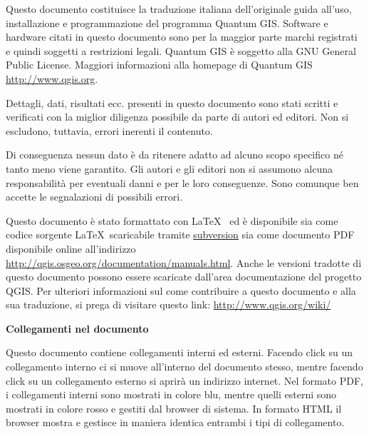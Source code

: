 \frontmatter
\pagestyle{scrplain}
\vspace{1cm}


Questo documento costituisce la traduzione italiana dell’originale guida all’uso, installazione e
programmazione del programma Quantum GIS. Software e hardware citati in questo documento
sono per la maggior parte marchi registrati e quindi soggetti a restrizioni legali. Quantum GIS è 
soggetto alla GNU General Public License. Maggiori informazioni alla homepage di Quantum GIS
\url{http://www.qgis.org}.
\par\bigskip
Dettagli, dati, risultati ecc. presenti in questo documento sono stati scritti e verificati con la miglior
diligenza possibile da parte di autori ed editori. Non si escludono, tuttavia, errori inerenti il contenuto.
\par\bigskip
Di conseguenza nessun dato è da ritenere adatto ad alcuno scopo specifico né tanto meno viene
garantito. Gli autori e gli editori non si assumono alcuna responsabilità per eventuali danni e per le
loro conseguenze. Sono comunque ben accette le segnalazioni di possibili errori.
\par\bigskip
Questo documento è stato formattato con \LaTeX~ ed è disponibile sia come codice sorgente \LaTeX~scaricabile 
tramite \href{http://wiki.qgis.org/qgiswiki/DocumentationWritersCorner}{subversion} 
sia come documento PDF disponibile online all’indirizzo \url{http://qgis.osgeo.org/documentation/manuals.html}. 
Anche le versioni tradotte di questo documento possono essere scaricate dall’area 
documentazione del progetto QGIS. Per ulteriori informazioni sul come contribuire a questo 
documento e alla sua traduzione, si prega di visitare questo link: \url{http://www.qgis.org/wiki/} 

\vspace{1cm}
\noindent
\textbf{Collegamenti nel documento}
\par\bigskip
Questo documento contiene collegamenti interni ed esterni. Facendo click su un collegamento 
interno ci si muove all’interno del documento stesso, mentre facendo click su un collegamento 
esterno si aprirà un indirizzo internet. Nel formato PDF, i collegamenti interni sono mostrati 
in colore blu, mentre quelli esterni sono mostrati in colore rosso e gestiti dal browser di sistema. 
In formato HTML il browser mostra e gestisce in maniera identica entrambi i tipi di collegamento.

